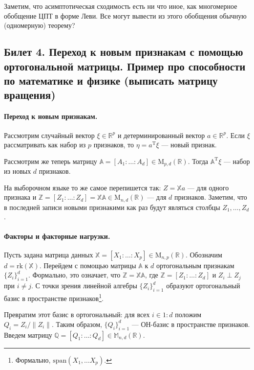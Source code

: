 Заметим, что асимптотическая сходимость есть ни что иное, как многомерное обобщение ЦПТ в форме Леви. Все могут вывести из этого обобщения обычную (одномерную) теорему?

\subsection{Билет 4. Переход к новым признакам с помощью ортогональной матрицы. Пример про способности по математике и физике (выписать матрицу вращения)}

\paragraph{Переход к новым признакам.}
Рассмотрим случайный вектор $\xi \in \mathbb R^p$ и детерминированный вектор $a \in \mathbb R^p$.
Если $\xi$ рассматривать как набор из $p$ признаков, то $\eta = a^\mathrm T \xi$ --- новый признак.

Рассмотрим же теперь матрицу $\mathbb A = [A_1 \colon \ldots \colon A_d] \in \mathrm M_{p, d}(\mathbb R)$. Тогда $\mathbb A^\mathrm T \xi$ --- набор из новых $d$ признаков.

На выборочном языке то же самое перепишется так:
$Z = \mathbb X a$ --- для одного признака и $\mathbb Z = [Z_1 \colon \ldots \colon Z_d] = \mathbb {X A} \in \mathrm M_{n, d}(\mathbb R)$ --- для $d$ признаков.
Заметим, что в последней записи новыми признакими как раз будут являться столбцы $Z_1, \ldots, Z_d$.

\paragraph{Факторы и факторные нагрузки.}
Пусть задана матрица данных $\mathbb X = [X_1 \colon \ldots \colon X_p] \in \mathrm M_{n, p}(\mathbb R)$. Обозначим $d = \mathrm{rk} (\mathbb X)$.
Перейдем с помощью матрицы $\mathbb A$ к $d$ ортогональным признакам $\{Z_i\}_{i=1}^d$.
Формально, это означает, что $\mathbb Z = \mathbb {X A}$, где $\mathbb Z = [Z_1 \colon \ldots \colon Z_d]$ и $Z_i \perp Z_j$ при $i \neq j$.
С точки зрения линейной алгебры $\{Z_i\}_{i=1}^d$ образуют ортогональный базис в пространстве признаков\footnote{Формально, $\mathrm {span} (X_1, \ldots X_p)$.}.

Превратим этот базис в ортогональный: для всех $i \in 1:d$ положим $Q_i = Z_i / \|Z_i\|$.
Таким образом, $\{Q_i\}_{i=1}^d$ --- ОН-базис в пространстве признаков.
Введем матрицу $\mathbb Q = [Q_1 \colon \ldots \colon Q_d] \in \mathbb M_{n,d}(\mathbb R)$.

